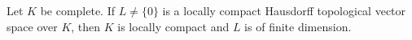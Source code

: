 Let $K$ be complete. If $L \neq \{0\}$ is a locally compact Hausdorff topological vector space over $K$, then $K$ is locally compact and $L$ is of finite dimension.
